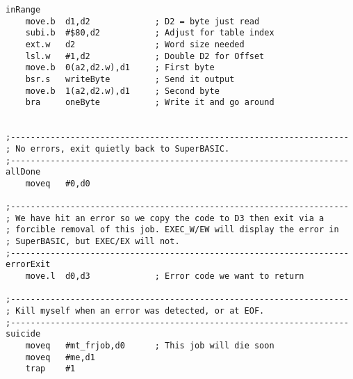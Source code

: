\begin{lstlisting}[firstnumber=1, caption={Wolfgang's improved ql2utf8 Utility}]
inRange
    move.b  d1,d2             ; D2 = byte just read
    subi.b  #$80,d2           ; Adjust for table index
    ext.w   d2                ; Word size needed
    lsl.w   #1,d2             ; Double D2 for Offset
    move.b  0(a2,d2.w),d1     ; First byte
    bsr.s   writeByte         ; Send it output
    move.b  1(a2,d2.w),d1     ; Second byte
    bra     oneByte           ; Write it and go around


;--------------------------------------------------------------------
; No errors, exit quietly back to SuperBASIC.
;--------------------------------------------------------------------
allDone
    moveq   #0,d0

;--------------------------------------------------------------------
; We have hit an error so we copy the code to D3 then exit via a
; forcible removal of this job. EXEC_W/EW will display the error in
; SuperBASIC, but EXEC/EX will not.
;--------------------------------------------------------------------
errorExit
    move.l  d0,d3             ; Error code we want to return

;--------------------------------------------------------------------
; Kill myself when an error was detected, or at EOF.
;--------------------------------------------------------------------
suicide
    moveq   #mt_frjob,d0      ; This job will die soon
    moveq   #me,d1
    trap    #1


\end{lstlisting}
